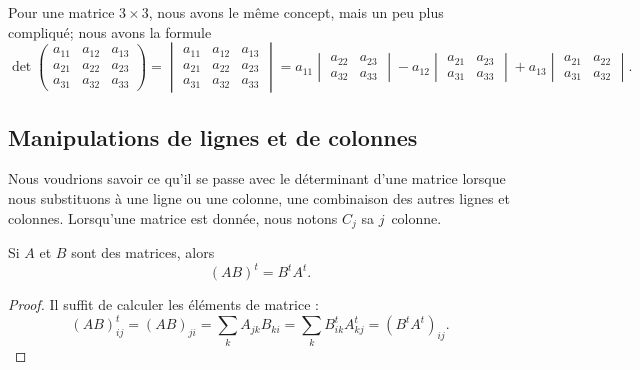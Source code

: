 Pour une matrice \( 3\times 3\), nous avons le même concept, mais un peu plus compliqué; nous avons la formule
\begin{equation}
	\det
	\begin{pmatrix}
		a_{11} & a_{12} & a_{13} \\
		a_{21} & a_{22} & a_{23} \\
		a_{31} & a_{32} & a_{33}
	\end{pmatrix}
	=
	\begin{vmatrix}
		a_{11} & a_{12} & a_{13} \\
		a_{21} & a_{22} & a_{23} \\
		a_{31} & a_{32} & a_{33}
	\end{vmatrix}=
	a_{11}\begin{vmatrix}
		a_{22} & a_{23} \\
		a_{32} & a_{33}
	\end{vmatrix}-
	a_{12}\begin{vmatrix}
		a_{21} & a_{23} \\
		a_{31} & a_{33}
	\end{vmatrix}+
	a_{13}\begin{vmatrix}
		a_{21} & a_{22} \\
		a_{31} & a_{32}
	\end{vmatrix}.
\end{equation}

\subsection{Manipulations de lignes et de colonnes}

Nous voudrions savoir ce qu'il se passe avec le déterminant d'une matrice lorsque nous substituons à une ligne ou une colonne, une combinaison des autres lignes et colonnes. Lorsqu'une matrice est donnée, nous notons \( C_j\) sa \( j\)\ieme\ colonne.

\begin{lemma}        \label{LEMooRSJTooQEoOtN}
	Si \( A\) et \( B\) sont des matrices, alors
	\begin{equation}
		(AB)^t=B^tA^t.
	\end{equation}
\end{lemma}

\begin{proof}
	Il suffit de calculer les éléments de matrice :
	\begin{equation}
		(AB)^t_{ij}=(AB)_{ji}=\sum_k A_{jk}B_{ki}=\sum_kB^t_{ik}A^t_{kj}=(B^tA^t)_{ij}.
	\end{equation}
\end{proof}

